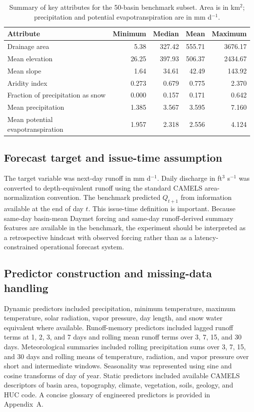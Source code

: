 \documentclass[preprint,12pt,authoryear]{elsarticle}
\begin{document}
\begin{table}[htbp]
\centering
\caption{Summary of key attributes for the 50-basin benchmark subset. Area is in km$^2$; precipitation and potential evapotranspiration are in mm d$^{-1}$.}
\label{tab:subset}
\small
\begin{tabular}{lrrrr}
\toprule
Attribute & Minimum & Median & Mean & Maximum \\
\midrule
Drainage area & 5.38 & 327.42 & 555.71 & 3676.17 \\
Mean elevation & 26.25 & 397.93 & 506.37 & 2434.67 \\
Mean slope & 1.64 & 34.61 & 42.49 & 143.92 \\
Aridity index & 0.273 & 0.679 & 0.775 & 2.370 \\
Fraction of precipitation as snow & 0.000 & 0.157 & 0.171 & 0.642 \\
Mean precipitation & 1.385 & 3.567 & 3.595 & 7.160 \\
Mean potential evapotranspiration & 1.957 & 2.318 & 2.556 & 4.124 \\
\bottomrule
\end{tabular}
\end{table}

\subsection{Forecast target and issue-time assumption}

The target variable was next-day runoff in mm d$^{-1}$. Daily discharge in ft$^3$ s$^{-1}$ was converted to depth-equivalent runoff using the standard CAMELS area-normalization convention. The benchmark predicted $Q_{t+1}$ from information available at the end of day $t$. This issue-time definition is important. Because same-day basin-mean Daymet forcing and same-day runoff-derived summary features are available in the benchmark, the experiment should be interpreted as a retrospective hindcast with observed forcing rather than as a latency-constrained operational forecast system.

\subsection{Predictor construction and missing-data handling}

Dynamic predictors included precipitation, minimum temperature, maximum temperature, solar radiation, vapor pressure, day length, and snow water equivalent where available. Runoff-memory predictors included lagged runoff terms at 1, 2, 3, and 7 days and rolling mean runoff terms over 3, 7, 15, and 30 days. Meteorological summaries included rolling precipitation sums over 3, 7, 15, and 30 days and rolling means of temperature, radiation, and vapor pressure over short and intermediate windows. Seasonality was represented using sine and cosine transforms of day of year. Static predictors included available CAMELS descriptors of basin area, topography, climate, vegetation, soils, geology, and HUC code. A concise glossary of engineered predictors is provided in Appendix~A.
\end{document}
